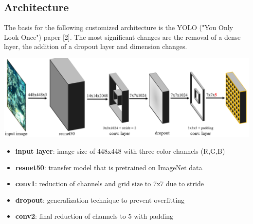 \documentclass[landscape,a2,final,12pt]{issposter}
\begin{document}
\begin{multicols}{3}
\section{Architecture}
    \begin{small}
        The basis for the following customized architecture is the YOLO ("You Only Look Once") paper [2].
        The most significant changes are the removal of a dense layer, the addition of a dropout layer and dimension changes.
    \end{small}

    \begin{center}
        \includegraphics[scale=0.7]{2_architecture.png}
    \end{center}
    \begin{small}
        \begin{itemize}
            \item {\textbf{input layer}: image size of 448x448 with three color channels (R,G,B)}
            \item {\textbf{resnet50}: transfer model that is pretrained on ImageNet data}
            \item {\textbf{conv1}: reduction of channels and grid size to 7x7 due to stride}
            \item {\textbf{dropout}: generalization technique to prevent overfitting}
            \item {\textbf{conv2}: final reduction of channels to 5 with padding}
        \end{itemize}
    \end{small}
    \columnbreak

\end{multicols}
\end{document}
